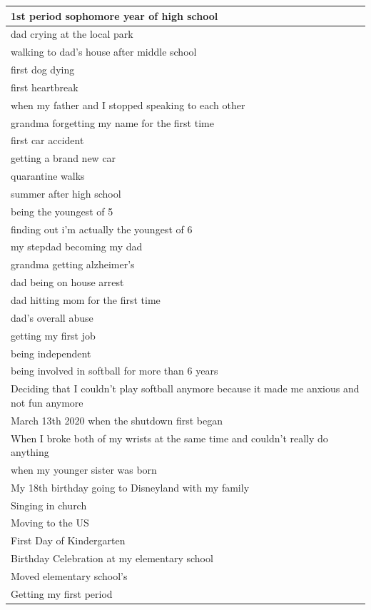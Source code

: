 \documentclass[
  .7em,
  letterpaper,
  DIV=11,
  numbers=noendperiod]{scrartcl}
\begin{document}
\begin{table}
\begin{tabular}{l}
\hline
1st period sophomore year of high school\\
\hline
dad crying at the local park\\
\hline
walking to dad's house after middle school\\
\hline
first dog dying\\
\hline
first heartbreak\\
\hline
when my father and I stopped speaking to each other\\
\hline
grandma forgetting my name for the first time\\
\hline
first car accident\\
\hline
getting a brand new car\\
\hline
quarantine walks\\
\hline
summer after high school\\
\hline
being the youngest of 5\\
\hline
finding out i'm actually the youngest of 6\\
\hline
my stepdad becoming my dad\\
\hline
grandma getting alzheimer's\\
\hline
dad being on house arrest\\
\hline
dad hitting mom for the first time\\
\hline
dad's overall abuse\\
\hline
getting my first job\\
\hline
being independent\\
\hline
being involved in softball for more than 6 years\\
\hline
Deciding that I couldn't play softball anymore because it made me anxious and not fun anymore\\
\hline
March 13th 2020 when the shutdown first began\\
\hline
When I broke both of my wrists at the same time and couldn't really do anything\\
\hline
when my younger sister was born\\
\hline
My 18th birthday going to Disneyland with my family\\
\hline
Singing in church\\
\hline
Moving to the US\\
\hline
First Day of Kindergarten\\
\hline
Birthday Celebration at my elementary school\\
\hline
Moved elementary school's\\
\hline
Getting my first period\\

\end{tabular}
\end{table}
\end{document}
